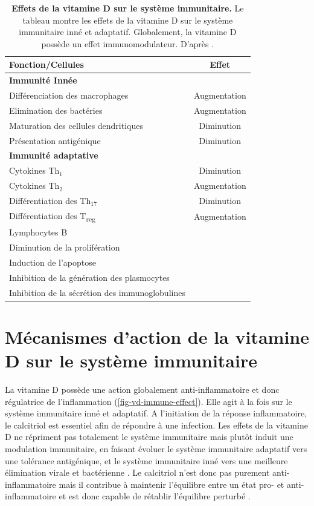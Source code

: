 \documentclass[
  a4paper,
  DIV=11,
  numbers=noendperiod,
  listof=totoc]{scrreprt}
\begin{document}
\begin{table}
\centering
\caption[\textbf{Effets de la vitamine D sur le système immunitaire.}]{\textbf{Effets de la vitamine D sur le système immunitaire.} Le tableau montre les effets de la vitamine D sur le système immunitaire inné et adaptatif. Globalement, la vitamine D possède un effet immunomodulateur. D'après \textcite{Giannini.2022}.}
\label{tbl-vd-immu}
\begin{tabular}{lc}
\toprule
\textbf{Fonction/Cellules} & \textbf{Effet} \\
\midrule
\textbf{Immunité Innée} & \\
Différenciation des macrophages & Augmentation \\
Elimination des bactéries & Augmentation \\
Maturation des cellules dendritiques & Diminution \\
Présentation antigénique & Diminution \\
\midrule
\textbf{Immunité adaptative} & \\
Cytokines Th$_1$ & Diminution \\
Cytokines Th$_2$ & Augmentation \\
Différentiation des Th${_{17}}$ & Diminution \\
Différentiation des T\textsubscript{reg} & Augmentation \\
\addlinespace
Lymphocytes B & \\
Diminution de la prolifération & \\
Induction de l'apoptose & \\
Inhibition de la génération des plasmocytes & \\
Inhibition de la sécrétion des immunoglobulines & \\
\bottomrule
\end{tabular}
\end{table}

\hypertarget{muxe9canismes-daction-de-la-vitamine-d-sur-le-systuxe8me-immunitaire}{%
\section{Mécanismes d'action de la vitamine D sur le système
immunitaire}\label{muxe9canismes-daction-de-la-vitamine-d-sur-le-systuxe8me-immunitaire}}

La vitamine D possède une action globalement anti-inflammatoire et donc
régulatrice de l'inflammation (\cref{fig-vd-immune-effect}). Elle agit à
la fois sur le système immunitaire inné et adaptatif. A l'initiation de
la réponse inflammatoire, le calcitriol est essentiel afin de répondre à
une infection. Les effets de la vitamine D ne répriment pas totalement
le système immunitaire mais plutôt induit une modulation immunitaire, en
faisant évoluer le système immunitaire adaptatif vers une tolérance
antigénique, et le système immunitaire inné vers une meilleure
élimination virale et bactérienne \autocite{Martens.2020}. Le calcitriol
n'est donc pas purement anti-inflammatoire mais il contribue à maintenir
l'équilibre entre un état pro- et anti-inflammatoire et est donc capable
de rétablir l'équilibre perturbé \autocite{Dankers.2017}.
\end{document}
